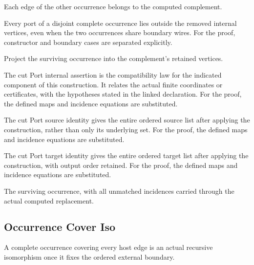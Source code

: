 Each edge of the other occurrence belongs to the computed complement.
\par{}

Every port of a disjoint complete occurrence lies outside the removed internal vertices, even when the two occurrences share boundary wires.
For the proof, constructor and boundary cases are separated explicitly.
\par{}

Project the surviving occurrence into the complement's retained vertices.
\par{}

The cut Port internal assertion is the compatibility law for the indicated component of this construction. It relates the actual finite coordinates or certificates, with the hypotheses stated in the linked declaration.
For the proof, the defined maps and incidence equations are substituted.
\par{}

The cut Port source identity gives the entire ordered source list after applying the construction, rather than only its underlying set.
For the proof, the defined maps and incidence equations are substituted.
\par{}

The cut Port target identity gives the entire ordered target list after applying the construction, with output order retained.
For the proof, the defined maps and incidence equations are substituted.
\par{}

The surviving occurrence, with all unmatched incidences carried through the actual computed replacement.
\par{}

\subsection{Occurrence Cover Iso}
A complete occurrence covering every host edge is an actual recursive isomorphism once it fixes the ordered external boundary.

